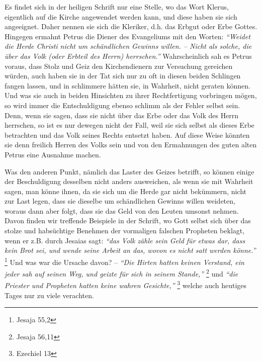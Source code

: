 Es findet sich in der heiligen Schrift nur eine Stelle, wo das Wort
Klerus,
eigentlich auf die Kirche angewendet werden kann, und diese haben sie sich
angeeignet. Daher nennen sie sich die Kleriker, d.h. das Erbgut oder Erbe
Gottes. Hingegen ermahnt Petrus die Diener des
Evangeliums mit den Worten:
\textit{"`Weidet die Herde Christi nicht um schändlichen Gewinns willen. --
Nicht
als solche, die über das Volk (oder Erbteil des Herrn) herrschen."'}
Wahrscheinlich sah es Petrus voraus, dass Stolz und Geiz den Kirchendienern zur
Versuchung gereichen würden, auch haben sie in der Tat sich nur zu oft in
diesen beiden Schlingen fangen lassen, und in schlimmere hätten sie, in
Wahrheit, nicht geraten können. Und was sie auch in beiden Hinsichten zu ihrer
Rechtfertigung vorbringen mögen, so wird immer die Entschuldigung ebenso
schlimm als der Fehler selbst sein. Denn, wenn sie sagen, dass sie nicht über das
Erbe oder das Volk des Herrn herrschen, so ist es nur dewegen nicht der Fall,
weil sie sich selbst als dieses Erbe betrachten und das Volk seines Rechts
entsetzt haben. Auf diese Weise könnten sie denn freilich Herren des Volks sein
und von den Ermahnungen des guten alten Petrus eine Ausnahme machen.

\medskip

Was den anderen Punkt, nämlich das Laster des Geizes
betrifft, so können einige
der Beschuldigung desselben nicht anders ausweichen, als wenn sie mit Wahrheit
sagen, man könne ihnen, da sie sich um die Herde gar nicht bekümmern, nicht zur
Last legen, dass sie dieselbe um schändlichen Gewinns willen weideten, woraus
dann aber folgt, dass sie das Geld von den Leuten umsonst nehmen. Davon finden
wir treffende Beispiele in der Schrift, wo Gott selbst sich über das stolze und
habsüchtige Benehmen der vormaligen falschen Propheten beklagt, wenn er z.B.
durch Jesaias sagt:
\textit{"`das Volk zähle sein Geld für etwas dar, 
dass kein Brot sei,
und wende seine Arbeit an das, wovon es nicht satt werden könne."'}
\footnote{Jesaja 55,2}
Und was war die Ursache davon? --
\textit{"`Die Hirten hatten keinen Verstand, ein
jeder sah auf seinen Weg, und geizte für sich in seinem Stande,"'}
\footnote{Jesaja 56,11}
 und
\textit{"`die Priester und Propheten hatten keine wahren
Gesichte,"'}
\footnote{Ezechiel 13}
welche auch heutiges Tages nur zu viele
verachten.

